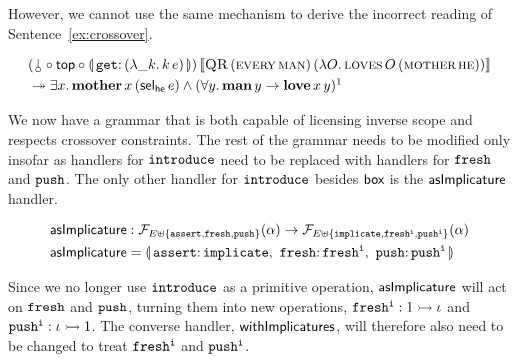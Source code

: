 However, we cannot use the same mechanism to derive the incorrect reading
of Sentence~\ref{ex:crossover}.

\begin{align*}
  &\ap{(\cherry \circ \TOP \circ \banana{\onto{\op{get}}{(\lam{\_ k}{\ap{k}{e}})}})}{\sem{\app{\abs{QR}}{(\ap{\abs{every}}{\abs{man}})}{(\lam{O}{\app{\abs{loves}}{O}{(\ap{\abs{mother}}{\abs{he}})}})}}} \\
  &\tto \exists x.\, \app{\obj{mother}}{x}{(\ap{\selhe}{e})} \land (\forall y.\, \ap{\obj{man}}{y} \to \app{\obj{love}}{x}{y})\footnotemark
\end{align*}

We now have a grammar that is both capable of licensing inverse scope and
respects crossover constraints. The rest of the grammar needs to be
modified only insofar as handlers for $\mathtt{introduce}$ need to be replaced
with handlers for $\mathtt{fresh}$ and $\mathtt{push}$. The only other handler for
$\mathtt{introduce}$ besides $\textsf{box}$ is the $\textsf{asImplicature}$ handler.

\begin{align*}
  \asImplicature &: \FF_{E \uplus \{\op{assert},\op{fresh},\op{push}\}}(\alpha) \to
                    \FF_{E \uplus \{\op{implicate},\op{fresh^i},\op{push^i}\}}(\alpha) \\
  \asImplicature &= \banana{\onto{\op{assert}}{\op{implicate}},\
                            \onto{\op{fresh}}{\op{fresh^i}},\
                            \onto{\op{push}}{\op{push^i}}}
\end{align*}

Since we no longer use $\mathtt{introduce}$ as a primitive operation,
$\textsf{asImplicature}$ will act on $\mathtt{fresh}$ and $\mathtt{push}$, turning them
into new operations, $\mathtt{fresh^i} : 1 \rightarrowtail \iota$ and
$\mathtt{push^i} : \iota \rightarrowtail 1$. The converse handler, $\textsf{withImplicatures}$,
will therefore also need to be changed to treat $\mathtt{fresh^i}$ and
$\mathtt{push^i}$.

